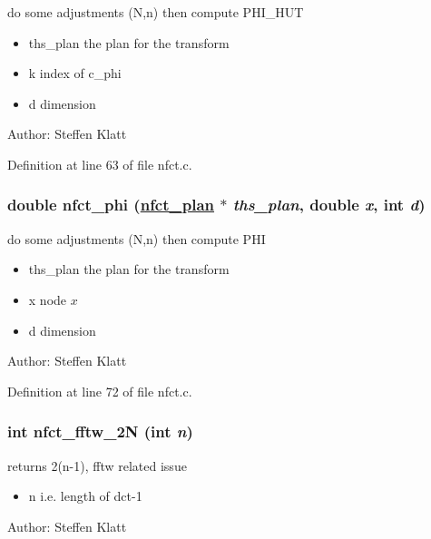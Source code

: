 do some adjustments (N,n) then compute PHI\_\-HUT 

\begin{itemize}
\item ths\_\-plan the plan for the transform \item k index of c\_\-phi \item d dimension\end{itemize}
\begin{Desc}
\item[Author:]Steffen Klatt \end{Desc}


Definition at line 63 of file nfct.c.\hypertarget{group__nfsct_ga12}{
\subsubsection[nfct\_\-phi]{\setlength{\rightskip}{0pt plus 5cm}double nfct\_\-phi (\hyperlink{structnfct__plan}{nfct\_\-plan} $\ast$ {\em ths\_\-plan}, double {\em x}, int {\em d})}}
\label{group__nfsct_ga12}


do some adjustments (N,n) then compute PHI 

\begin{itemize}
\item ths\_\-plan the plan for the transform \item x node $x$ \item d dimension\end{itemize}
\begin{Desc}
\item[Author:]Steffen Klatt \end{Desc}


Definition at line 72 of file nfct.c.\hypertarget{group__nfsct_ga13}{
\subsubsection[nfct\_\-fftw\_\-2N]{\setlength{\rightskip}{0pt plus 5cm}int nfct\_\-fftw\_\-2N (int {\em n})}}
\label{group__nfsct_ga13}


returns 2(n-1), fftw related issue 

\begin{itemize}
\item n i.e. length of dct-1\end{itemize}
\begin{Desc}
\item[Author:]Steffen Klatt \end{Desc}


